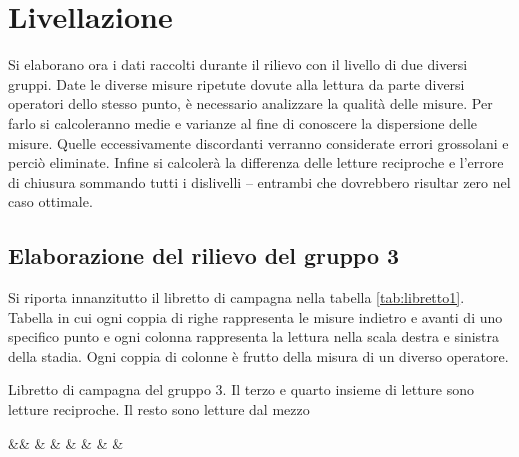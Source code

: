 \chapter{Livellazione}\label{cap:cap2}
\newcommand{\libretto}[3]{%
\begin{table}[htb]\footnotesize
\caption{#1}
\label{#2}
\centering
\csvreader[centered tabular=c@{}SSSSSSSS,
	table head=\toprule &$\mathbf{L_{dx}}$ & $\mathbf{L_{sx}}$ & $\mathbf{L_{dx}}$ %
	& $\mathbf{L_{sx}}$ & $\mathbf{L_{dx}}$ & $\mathbf{L_{sx}}$ & $\mathbf{L_{dx}}$ & $\mathbf{L_{sx}}$ \\\midrule,
	table foot = \bottomrule]%
	{#3}{}%
	{&\csvcoli & \csvcolii & \csvcoliii & %
	\csvcoliv & \csvcolv & \csvcolvi & %
	\csvcolvii & \csvcolviii}
\end{table}}
\newcommand{\elaborazione}[3]{%
\begin{table}[htb]\footnotesize
\caption{#1}
\label{#2}
\centering
\csvreader[centered tabular=c@{}rSSSSSSSS,
	no head, %
	table head=\toprule &&$\mathbf{1}$ & $\mathbf{2}$ & $\mathbf{3}$ %
	& $\mathbf{4}$ & $\mathbf{5}$ & $\mathbf{6}$ & $\mathbf{7}$ & $\mathbf{8}$ \\\midrule,
	table foot = \bottomrule]%
	{#3}{}%
	{&\textbf{\csvcolix} & \csvcoli & \csvcolii & \csvcoliii & %
	\csvcoliv & \csvcolv & \csvcolvi & %
	\csvcolvii & \csvcolviii}
\end{table}}
Si elaborano ora i dati raccolti durante il rilievo con il livello di due diversi gruppi. Date le diverse misure ripetute dovute alla lettura da parte diversi operatori dello stesso punto, è necessario analizzare la qualità delle misure. 
Per farlo si calcoleranno medie e varianze al fine di conoscere la dispersione delle misure. 
Quelle eccessivamente discordanti verranno considerate errori grossolani e perciò eliminate. 
Infine si calcolerà la differenza delle letture reciproche e  l'errore di chiusura sommando tutti i dislivelli -- entrambi che dovrebbero risultar zero nel caso ottimale.
\section{Elaborazione del rilievo del gruppo 3}
Si riporta innanzitutto il libretto di campagna nella tabella \ref{tab:libretto1}.
Tabella in cui ogni coppia di righe rappresenta le misure indietro e avanti di uno specifico punto e ogni colonna rappresenta la lettura nella scala destra e sinistra della stadia.
Ogni coppia di colonne è frutto della misura di un diverso operatore. 
\libretto{Libretto di campagna del gruppo 3. Il terzo e quarto insieme di letture sono letture reciproche. Il resto sono letture dal mezzo}{tab:libretto1}{documents/livLibretto1.csv}

